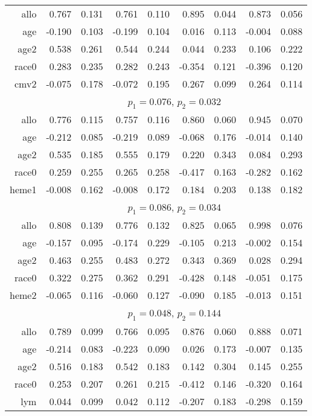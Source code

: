 \documentclass[a4paper,10pt]{article}
\begin{document}
\begin{table}[ht]
\begin{tabular}{rrrrrrrrr}
    allo & 0.767 & 0.131 & 0.761 & 0.110 & 0.895 & 0.044 & 0.873 & 0.056 \\ 
    age & -0.190 & 0.103 & -0.199 & 0.104 & 0.016 & 0.113 & -0.004 & 0.088 \\ 
    age2 & 0.538 & 0.261 & 0.544 & 0.244 & 0.044 & 0.233 & 0.106 & 0.222 \\ 
    race0 & 0.283 & 0.235 & 0.282 & 0.243 & -0.354 & 0.121 & -0.396 & 0.120 \\ 
    cmv2 & -0.075 & 0.178 & -0.072 & 0.195 & 0.267 & 0.099 & 0.264 & 0.114 \\ 
    [1ex]
    & \multicolumn{8}{c}{$p_1 = 0.076$, $p_2 = 0.032$}\\
    allo & 0.776 & 0.115 & 0.757 & 0.116 & 0.860 & 0.060 & 0.945 & 0.070 \\ 
    age & -0.212 & 0.085 & -0.219 & 0.089 & -0.068 & 0.176 & -0.014 & 0.140 \\ 
    age2 & 0.535 & 0.185 & 0.555 & 0.179 & 0.220 & 0.343 & 0.084 & 0.293 \\ 
    race0 & 0.259 & 0.255 & 0.265 & 0.258 & -0.417 & 0.163 & -0.282 & 0.162 \\ 
    heme1 & -0.008 & 0.162 & -0.008 & 0.172 & 0.184 & 0.203 & 0.138 & 0.182 \\ 
    [1ex]
    & \multicolumn{8}{c}{$p_1 = 0.086$, $p_2 = 0.034$}\\
    allo & 0.808 & 0.139 & 0.776 & 0.132 & 0.825 & 0.065 & 0.998 & 0.076 \\ 
    age & -0.157 & 0.095 & -0.174 & 0.229 & -0.105 & 0.213 & -0.002 & 0.154 \\ 
    age2 & 0.463 & 0.255 & 0.483 & 0.272 & 0.343 & 0.369 & 0.028 & 0.294 \\ 
    race0 & 0.322 & 0.275 & 0.362 & 0.291 & -0.428 & 0.148 & -0.051 & 0.175 \\ 
    heme2 & -0.065 & 0.116 & -0.060 & 0.127 & -0.090 & 0.185 & -0.013 & 0.151 \\ 
    [1ex]
    & \multicolumn{8}{c}{$p_1 = 0.048$, $p_2 = 0.144$}\\
    allo & 0.789 & 0.099 & 0.766 & 0.095 & 0.876 & 0.060 & 0.888 & 0.071 \\ 
    age & -0.214 & 0.083 & -0.223 & 0.090 & 0.026 & 0.173 & -0.007 & 0.135 \\ 
    age2 & 0.516 & 0.183 & 0.542 & 0.183 & 0.142 & 0.304 & 0.145 & 0.255 \\ 
    race0 & 0.253 & 0.207 & 0.261 & 0.215 & -0.412 & 0.146 & -0.320 & 0.164 \\ 
    lym & 0.044 & 0.099 & 0.042 & 0.112 & -0.207 & 0.183 & -0.298 & 0.159 \\ 
    \bottomrule
  \end{tabular}
\end{table}
\end{document}
